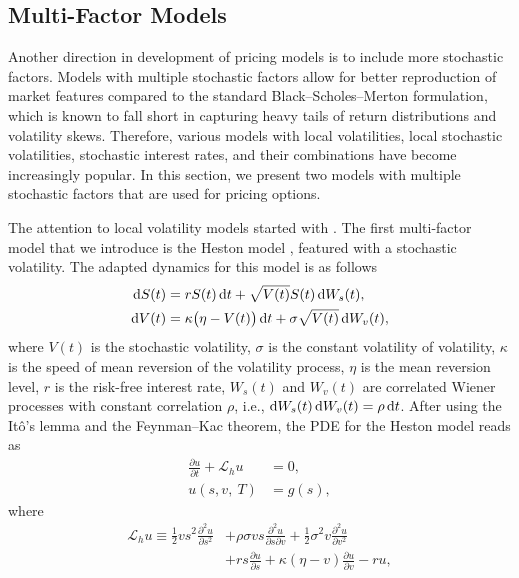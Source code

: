 \documentclass{UUThesisTemplate}
\begin{document}
\subsection{Multi-Factor Models}
\label{sub:multifactor}
\par Another direction in development of pricing models is to include more stochastic factors. Models with multiple stochastic factors allow for better reproduction of market features compared to the standard Black--Scholes--Merton formulation, which is known to fall short in capturing heavy tails of return distributions and volatility skews. Therefore, various models with local volatilities, local stochastic volatilities, stochastic interest rates, and their combinations have become increasingly popular. In this section, we present two models with multiple stochastic factors that are used for pricing options.
\par The attention to local volatility models started with \cite{dupire1994pricing}. The first multi-factor model that we introduce is the Heston model \cite{heston1993closed}, featured with a stochastic volatility. The adapted dynamics for this model is as follows
\begin{align}
\dif S(t) & =  rS(t)\dif t + \sqrt{V(t)} S(t) \dif W_s(t), \label{qlsvSDE1} \\
\dif V(t) & =  \kappa\big(\eta-V(t)\big)\dif t + \sigma \sqrt{V(t)}\dif W_v(t), \label{qlsvSDE2}
\end{align}
where $V(t)$ is the stochastic volatility, $\sigma$ is the constant volatility of volatility, $\kappa$ is the speed of mean reversion of the volatility process, $\eta$ is the mean reversion level, $r$ is the risk-free interest rate, $W_s(t)$ and $W_v(t)$ are correlated Wiener processes with constant correlation $\rho$, i.e., $\dif W_s(t) \dif W_v(t) = \rho \dif t$. After using the It\^{o}'s lemma and the Feynman--Kac theorem, the PDE for the Heston model reads as
\begin{align}
\frac{\partial u}{\partial t}+\mathcal{L}_h u&=0, \nonumber \\
u(s,v,\ T) &= g(s), \label{hstPDE}
\end{align}
where
\begin{align}
\mathcal{L}_{h} u \equiv \frac{1}{2}vs^2\frac{\partial^2 u}{\partial s^2} &+ \rho\sigma v s \frac{\partial^2 u}{\partial s\partial v} + \frac{1}{2}\sigma^2v\frac{\partial^2 u}{\partial v^2} \nonumber \\ 
               &+ rs\frac{\partial u}{\partial s} + \kappa(\eta-v)\frac{\partial u}{\partial v} - ru, \label{eqHSTop}
\end{align}
\end{document}

